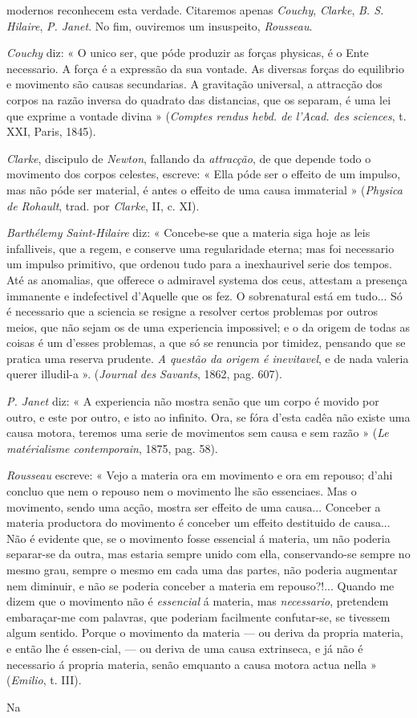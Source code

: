 modernos reconhecem esta verdade. Citaremos apenas \emph{Couchy}, \emph{Clarke}, \emph{B. S. Hilaire}, \emph{P. Janet}. No fim, ouviremos um insuspeito, \emph{Rousseau}.\par \emph{Couchy} diz: « O unico ser, que póde produzir as forças physicas, é o Ente necessario. A força é a expressão da sua vontade. As diversas forças do equilibrio e movimento são causas secundarias. A gravitação universal, a attracção dos corpos na razão inversa do quadrato das distancias, que os separam, é uma lei que exprime a vontade divina » (\emph{Comptes rendus hebd. de l'Acad. des sciences}, t. XXI, Paris, 1845).\par \emph{Clarke}, discipulo de \emph{Newton}, fallando da \emph{attracção}, de que depende todo o movimento dos corpos celestes, escreve: « Ella póde ser o effeito de um impulso, mas não póde ser material, é antes o effeito de uma causa immaterial » (\emph{Physica de Rohault}, trad. por \emph{Clarke}, II, c. XI).\par \emph{Barthélemy Saint-Hilaire} diz: « Concebe-se que a materia siga hoje as leis infalliveis, que a regem, e conserve uma regularidade eterna; mas foi necessario um impulso primitivo, que ordenou tudo para a inexhaurivel serie dos tempos. Até as anomalias, que offerece o admiravel systema dos ceus, attestam a presença immanente e indefectivel d'Aquelle que os fez. O sobrenatural está em tudo... Só é necessario que a sciencia se resigne a resolver certos problemas por outros meios, que não sejam os de uma experiencia impossivel; e o da origem de todas as coisas é um d'esses problemas, a que só se renuncia por timidez, pensando que se pratica uma reserva prudente. \emph{A questão da origem é inevitavel}, e de nada valeria querer illudil-a ». (\emph{Journal des Savants}, 1862, pag. 607).\par \emph{P. Janet} diz: « A experiencia não mostra senão que um corpo é movido por outro, e este por outro, e isto ao infinito. Ora, se fóra d'esta cadêa não existe uma causa motora, teremos uma serie de movimentos sem causa e sem razão » (\emph{Le matérialisme contemporain}, 1875, pag. 58).\par \emph{Rousseau} escreve: « Vejo a materia ora em movimento e ora em repouso; d'ahi concluo que nem o repouso nem o movimento lhe são essenciaes. Mas o movimento, sendo uma acção, mostra ser effeito de uma causa... Conceber a materia productora do movimento é conceber um effeito destituido de causa... Não é evidente que, se o movimento fosse essencial á materia, um não poderia separar-se da outra, mas estaria sempre unido com ella, conservando-se sempre no mesmo grau, sempre o mesmo em cada uma das partes, não poderia augmentar nem diminuir, e não se poderia conceber a materia em repouso?!... Quando me dizem que o movimento não é \emph{essencial} á materia, mas \emph{necessario}, pretendem embaraçar-me com palavras, que poderiam facilmente confutar-se, se tivessem algum sentido. Porque o movimento da materia --- ou deriva da propria materia, e então lhe é essen-cial, --- ou deriva de uma causa extrinseca, e já não é necessario á propria materia, senão emquanto a causa motora actua nella » (\emph{Emilio}, t. III).\par Na 
